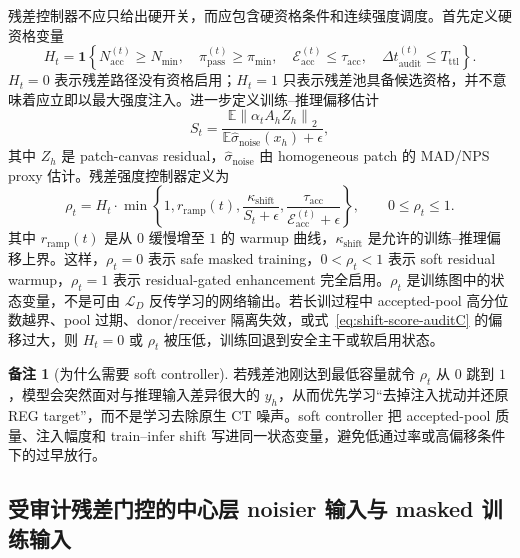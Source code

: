 \documentclass[11pt,a4paper,UTF8,fontset=fandol]{ctexart}
\theoremstyle{definition}
\newtheorem{remark}[theorem]{备注}
\newcommand{\norm}[1]{\left\lVert#1\right\rVert}
\newcommand{\E}{\mathbb{E}}
\newcommand{\cL}{\mathcal{L}}
\newcommand{\one}{\mathbf{1}}
\begin{document}
残差控制器不应只给出硬开关，而应包含硬资格条件和连续强度调度。首先定义硬资格变量
\begin{equation}
\label{eq:hard-eligibility-auditC}
    H_t
    =\one\left\{
    N_{\mathrm{acc}}^{(t)}\ge N_{\min},\quad
    \pi_{\mathrm{pass}}^{(t)}\ge\pi_{\min},\quad
    \mathcal E_{\mathrm{acc}}^{(t)}\le\tau_{\mathrm{acc}},\quad
    \Delta t_{\mathrm{audit}}^{(t)}\le T_{\mathrm{ttl}}
    \right\}.
\end{equation}
$H_t=0$ 表示残差路径没有资格启用；$H_t=1$ 只表示残差池具备候选资格，并不意味着应立即以最大强度注入。进一步定义训练--推理偏移估计
\begin{equation}
\label{eq:shift-score-auditC}
    S_t
    =\frac{\E\norm{\alpha_t A_hZ_h}_2}{\E\widehat\sigma_{\mathrm{noise}}(x_h)+\epsilon},
\end{equation}
其中 $Z_h$ 是 patch-canvas residual，$\widehat\sigma_{\mathrm{noise}}$ 由 homogeneous patch 的 MAD/NPS proxy 估计。残差强度控制器定义为
\begin{equation}
\label{eq:rho-controller-auditA}
    \rho_t
    = H_t\cdot
    \min\left\{1,
    r_{\mathrm{ramp}}(t),
    \frac{\kappa_{\mathrm{shift}}}{S_t+\epsilon},
    \frac{\tau_{\mathrm{acc}}}{\mathcal E_{\mathrm{acc}}^{(t)}+\epsilon}
    \right\},
    \qquad 0\le \rho_t\le1 .
\end{equation}
其中 $r_{\mathrm{ramp}}(t)$ 是从 $0$ 缓慢增至 $1$ 的 warmup 曲线，$\kappa_{\mathrm{shift}}$ 是允许的训练--推理偏移上界。这样，$\rho_t=0$ 表示 safe masked training，$0<\rho_t<1$ 表示 soft residual warmup，$\rho_t=1$ 表示 residual-gated enhancement 完全启用。$\rho_t$ 是训练图中的状态变量，不是可由 $\cL_D$ 反传学习的网络输出。若长训过程中 accepted-pool 高分位数越界、pool 过期、donor/receiver 隔离失效，或式~\eqref{eq:shift-score-auditC} 的偏移过大，则 $H_t=0$ 或 $\rho_t$ 被压低，训练回退到安全主干或软启用状态。

\begin{remark}[为什么需要 soft controller]
若残差池刚达到最低容量就令 $\rho_t$ 从 $0$ 跳到 $1$，模型会突然面对与推理输入差异很大的 $y_h$，从而优先学习“去掉注入扰动并还原 REG target”，而不是学习去除原生 CT 噪声。soft controller 把 accepted-pool 质量、注入幅度和 train--infer shift 写进同一状态变量，避免低通过率或高偏移条件下的过早放行。
\end{remark}

\subsection{受审计残差门控的中心层 noisier 输入与 masked 训练输入}
\end{document}
